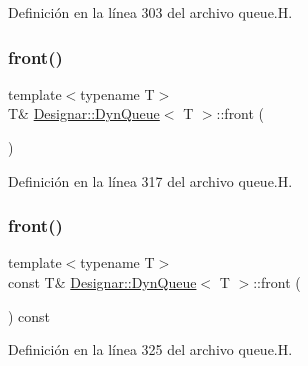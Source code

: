 Definición en la línea 303 del archivo queue.\+H.

\mbox{\label{class_designar_1_1_dyn_queue_a910f0dc9d3bf1c1b2363730db842980d}} 
\subsubsection{\texorpdfstring{front()}{front()}\hspace{0.1cm}{\footnotesize\ttfamily [1/2]}}
{\footnotesize\ttfamily template$<$typename T$>$ \\
T\& \hyperlink{class_designar_1_1_dyn_queue}{Designar\+::\+Dyn\+Queue}$<$ T $>$\+::front (\begin{DoxyParamCaption}{ }\end{DoxyParamCaption})\hspace{0.3cm}{\ttfamily [inline]}}



Definición en la línea 317 del archivo queue.\+H.

\mbox{\label{class_designar_1_1_dyn_queue_ae8e017797ad0ccd8a0568f69f8adedbf}} 
\subsubsection{\texorpdfstring{front()}{front()}\hspace{0.1cm}{\footnotesize\ttfamily [2/2]}}
{\footnotesize\ttfamily template$<$typename T$>$ \\
const T\& \hyperlink{class_designar_1_1_dyn_queue}{Designar\+::\+Dyn\+Queue}$<$ T $>$\+::front (\begin{DoxyParamCaption}{ }\end{DoxyParamCaption}) const\hspace{0.3cm}{\ttfamily [inline]}}



Definición en la línea 325 del archivo queue.\+H.

\mbox{\label{class_designar_1_1_dyn_queue_a70b3f577ec11287fe63766de53a2cb56}} 
